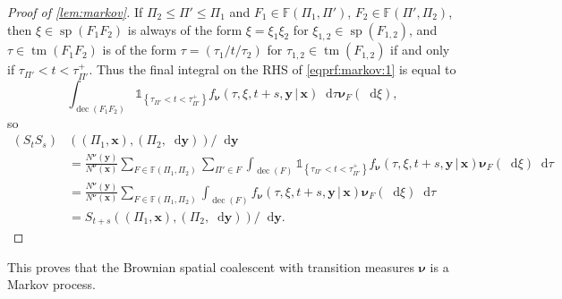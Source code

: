 \documentclass[reqno,draft]{amsart}
\numberwithin{equation}{section}
\theoremstyle{plain}
\theoremstyle{remark}
\newcommand*\diff{\mathop{}\!\mathrm{d}}
\newcommand{\ind}{\mathds{1}}
\newcommand{\fpart}{\Pi} %
\DeclareMathOperator{\dcb}{dec}
\DeclareMathOperator{\dct}{tm}
\DeclareMathOperator{\dcs}{sp}
\newcommand{\semi}{S}
\newcommand{\fnu}{f_{\boldsymbol \nu}}
\begin{document}
\begin{proof}[Proof of \cref{lem:markov}]
    If $\fpart_2 \le \fpart'\le \fpart_1$ and $F_1\in \mathbb{F}(\fpart_1,\fpart')$, $F_2\in \mathbb{F}(\fpart',\fpart_2)$, then $\xi \in \dcs(F_1F_2)$ is always of the form $\xi = \xi_1\xi_2$ for $\xi_{1,2}\in \dcs(F_{1,2})$, and $\tau \in \dct(F_1F_2)$ is of the form $\tau = (\tau_1 / t / \tau_2)$ for $\tau_{1,2}\in \dct(F_{1,2})$ if and only if $\tau_{\fpart'} < t < \tau_{\fpart'}^+$. Thus the final integral on the RHS of \cref{eqprf:markov:1} is equal to
    \begin{equation*}
        \int_{\dcb(F_1F_2)} \ind_{\left\{ \tau_{\fpart'} < t < \tau_{\fpart'}^+ \right\} } \fnu(\tau,\xi,t+s,\boldsymbol y \,\vert\,\boldsymbol x)  \diff \tau \boldsymbol \nu_F(\diff \xi),
    \end{equation*}
    so
    \begin{align*}
        (\semi_t\semi_s) &((\fpart_1,\boldsymbol x),(\fpart_2,\diff \boldsymbol y)) / \diff \boldsymbol y\\
                         &= \frac{N^{\boldsymbol\nu}(\boldsymbol y)}{N^{\boldsymbol\nu}(\boldsymbol x)} \sum_{F\in \mathbb{F}(\fpart_1,\fpart_2)}\sum_{\fpart'\in F} \int_{\dcb(F)} \ind_{\left\{ \tau_{\fpart'} < t < \tau_{\fpart'}^+ \right\} } \fnu(\tau,\xi,t+s,\boldsymbol y \,\vert\,\boldsymbol x)\boldsymbol \nu_F(\diff \xi) \diff \tau\\
                         &= \frac{N^{\boldsymbol\nu}(\boldsymbol y)}{N^{\boldsymbol\nu}(\boldsymbol x)} \sum_{F\in \mathbb{F}(\fpart_1,\fpart_2)} \int_{\dcb(F)} \fnu(\tau,\xi,t+s,\boldsymbol y \,\vert\,\boldsymbol x)\boldsymbol \nu_F(\diff \xi) \diff \tau\\
         &= \semi_{t+s}((\fpart_1,\boldsymbol x),(\fpart_2,\diff \boldsymbol y)) / \diff \boldsymbol y.
    \end{align*}
\end{proof}

This proves that the Brownian spatial coalescent with transition measures $\boldsymbol \nu$ is a Markov process.
\end{document}

